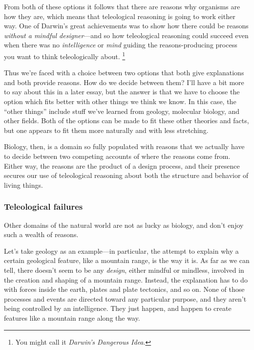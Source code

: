 		From both of these options it follows that there are reasons why organisms are how they are, which means that teleological reasoning is going to work either way. One of Darwin's great achievements was to show how there could be reasons \textit{without a mindful designer}---and so how teleological reasoning could succeed even when there was no \textit{intelligence} or \textit{mind} guiding the reasons-producing process you want to think teleologically about.%
			\footnote{You might call it \textit{Darwin's Dangerous Idea}.}
		
		Thus we're faced with a choice between two options that both give explanations and both provide reasons. How do we decide between them? I'll have a bit more to say about this in a later essay, but the answer is that we have to choose the option which fits better with other things we think we know. In this case, the ``other things'' include stuff we've learned from geology, molecular biology, and other fields. Both of the options can be made to fit these other theories and facts, but one appears to fit them more naturally and with less stretching.
		
		Biology, then, is a domain so fully populated with reasons that we actually have to decide between two competing accounts of where the reasons come from. Either way, the reasons are the product of a design process, and their presence secures our use of teleological reasoning about both the structure and behavior of living things.
		
	\subsubsection{Teleological failures}
	
		Other domains of the natural world are not as lucky as biology, and don't enjoy such a wealth of reasons.
		
		Let's take geology as an example---in particular, the attempt to explain why a certain geological feature, like a mountain range, is the way it is. As far as we can tell, there doesn't seem to be any \textit{design}, either mindful or mindless, involved in the creation and shaping of a mountain range. Instead, the explanation has to do with forces inside the earth, plates and plate tectonics, and so on. None of those processes and events are directed toward any particular purpose, and they aren't being controlled by an intelligence. They just happen, and happen to create features like a mountain range along the way.
		
